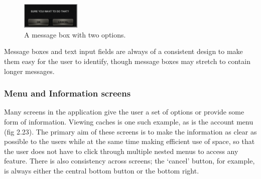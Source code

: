 \begin{figure}
	\vspace{-20pt}
	\begin{center}
	\includegraphics[width=0.25\textwidth]{images/message_box_question_mockup}
	\caption{A message box with two options.}
	\label{message_box_two_options}
	\end{center}
	\vspace{-50pt}
\end{figure}

Message boxes and text input fields are always of a consistent design to make them easy for the user to identify, though message boxes may stretch to contain longer messages.

\subsubsection{Menu and Information screens}

Many screens in the application give the user a set of options or provide some form of information. Viewing caches is one such example, as is the account menu (fig 2.23). The primary aim of these screens is to make the information as clear as possible to the users while at the same time making efficient use of space, so that the user does not have to click through multiple nested menus to access any feature. There is also consistency across screens; the `cancel' button, for example, is always either the central bottom button or the bottom right.


